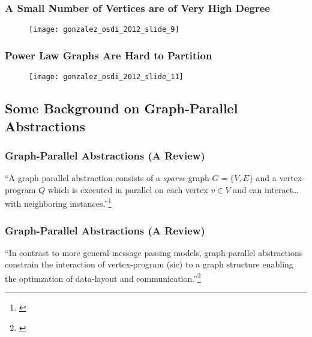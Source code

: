 \begin{frame}
  \frametitle{A Small Number of Vertices are of Very High Degree}
  \begin{figure}
    \centering
    \texttt{[image: gonzalez\_osdi\_2012\_slide\_9]}
    \caption{\cite[OSDI '12 Slides]{gonzalez2012powergraph-slides}}
  \end{figure}
\end{frame}

\begin{frame}
  \frametitle{Power Law Graphs Are Hard to Partition}
  \begin{figure}
    \centering
    \texttt{[image: gonzalez\_osdi\_2012\_slide\_11]}
    \caption{\cite[OSDI '12 Slides]{gonzalez2012powergraph-slides}}
  \end{figure}
\end{frame}


\subsection{Some Background on Graph-Parallel Abstractions}

\begin{frame}
  \frametitle{Graph-Parallel Abstractions (A Review)}
  ``A graph parallel abstraction consists of a \textit{sparse} graph
  $G = \{V,E\}$ and a vertex-program $Q$ which is executed in parallel on each
  vertex $v \in V$ and can interact\ldots with neighboring
  instances.''\footnote{\cite[OSDI '12]{gonzalez2012powergraph}}


\end{frame}

\begin{frame}
  \frametitle{Graph-Parallel Abstractions (A Review)}
  ``In contrast to more general message passing models, graph-parallel
  abstractions constrain the interaction of vertex-program (sic) to a graph
  structure enabling the optimzation of data-layout and
  communication.''\footnote{\cite[OSDI '12]{gonzalez2012powergraph}}
\end{frame}

